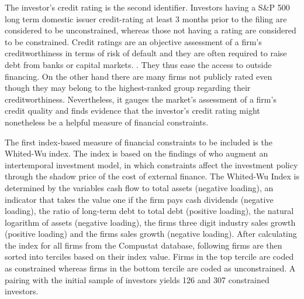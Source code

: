 \documentclass[12pt]{article}
\begin{document}
The investor's credit rating is the second identifier. Investors having a S\&P 500 long term domestic issuer credit-rating at least 3 months prior to the filing are considered to be unconstrained, whereas those not having a rating are considered to be constrained. Credit ratings are an objective assessment of a firm's creditworthiness in terms of risk of default and they are often required to raise debt from banks or capital markets. \citep[p.18]{heller2015}. They thus ease the access to outside financing. On the other hand there are many firms not publicly rated even though they may belong to the highest-ranked group regarding their creditworthiness. Nevertheless, it gauges the market's assessment of a firm's credit quality \citep[p.1790]{Almeida2004} and \citet[p.175]{heller2015} finds evidence that the investor's credit rating might nonetheless be a helpful measure of financial constraints.\par
The first index-based measure of financial constraints to be included is the Whited-Wu index. The index is based on the findings of \citet[p.543]{Whited2006} who augment an intertemporal investment model, in which constraints affect the investment policy through the shadow price of the cost of external finance. The Whited-Wu Index is determined by the variables cash flow to total assets (negative loading), an indicator that takes the value one if the firm pays cash dividends (negative loading), the ratio of long-term debt to total debt (positive loading), the natural logarithm of assets (negative loading), the firms three digit industry sales growth (positive loading) and the firms sales growth (negative loading). After calculating the index for all firms from the Compustat database, following \citet[p.305]{Farre-Mensa2016} firms are then sorted into terciles based on their index value. Firms in the top tercile are coded as constrained whereas firms in the bottom tercile are coded as unconstrained. A pairing with the initial sample of investors yields 126 and 307 constrained investors.\par
\end{document}
